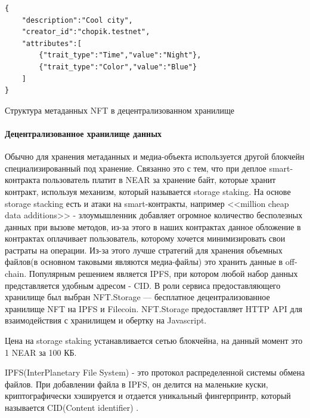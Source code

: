 \begin{listing}
\begin{verbatim}
{
    "description":"Cool city",
    "creator_id":"chopik.testnet",
    "attributes":[
        {"trait_type":"Time","value":"Night"},
        {"trait_type":"Color","value":"Blue"}
    ]
}
\end{verbatim}
\caption{Структура метаданных NFT в децентрализованном хранилище}
\label{lst.nftmetadata}
\end{listing}

\paragraph{Децентрализованное хранилище данных}
\label{section.main.bot.storage}

Обычно для хранения метаданных и медиа-объекта используется другой блокчейн специализированный под хранение. Связанно это с тем, что при деплое smart-контракта пользователь платит в NEAR за хранение байт, которые хранит контракт, используя механизм, который называется storage staking. На основе storage stacking есть и атаки на smart-контракты, например <<million cheap data additions>> - злоумышленник добавляет огромное количество бесполезных данных при вызове методов, из-за этого в наших контрактах данное обложение в контрактах оплачивает пользователь, которому хочется минимизировать свои растраты на операции. Из-за этого лучше стратегий для хранения объемных файлов(в основном таковыми являются медиа-файлы) это хранить данные в off-chain. Популярным решением является IPFS, при котором любой набор данных представляется удобным адресом - CID. В роли сервиса предоставляющего хранилище был выбран NFT.Storage\cite{nftstorage} --- бесплатное децентрализованное хранилище NFT на IPFS\cite{ipfs} и Filecoin\cite{filecoin}. NFT.Storage предоставляет HTTP API для взаимодействия с хранилищем и обертку на Javascript.

\begin{remark}
    Цена на storage staking устанавливается сетью блокчейна, на данный момент это 1 NEAR за 100 КБ.
\end{remark}

\begin{definition}
    IPFS(InterPlanetary File System) - это протокол распределенной системы обмена файлов. При добавлении файла в IPFS, он делится на маленькие куски, криптографически хэшируется и отдается уникальный фингерпринтр, который называется CID(Content identifier) \cite{ipfs}.
\end{definition}

